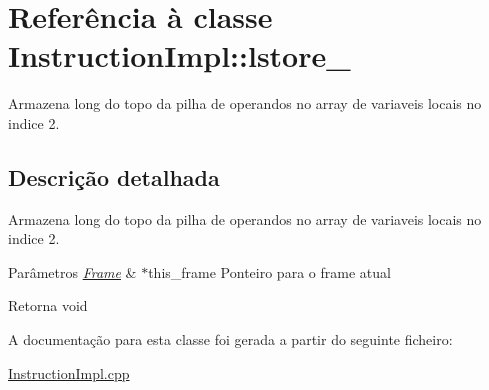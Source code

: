 \hypertarget{class_instruction_impl_1_1lstore__2}{}\section{Referência à classe Instruction\+Impl\+:\+:lstore\+\_}
\label{class_instruction_impl_1_1lstore__2}


Armazena long do topo da pilha de operandos no array de variaveis locais no indice 2.  




\subsection{Descrição detalhada}
Armazena long do topo da pilha de operandos no array de variaveis locais no indice 2. 


\begin{DoxyParams}{Parâmetros}
{\em \hyperlink{struct_frame}{Frame}} & $\ast$this\+\_\+frame Ponteiro para o frame atual \\
\hline
\end{DoxyParams}
\begin{DoxyReturn}{Retorna}
void 
\end{DoxyReturn}


A documentação para esta classe foi gerada a partir do seguinte ficheiro\+:\begin{DoxyCompactItemize}
\item 
\hyperlink{_instruction_impl_8cpp}{Instruction\+Impl.\+cpp}\end{DoxyCompactItemize}
